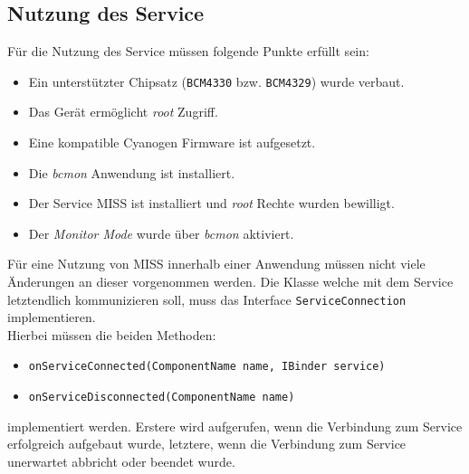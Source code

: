 \documentclass[]{report}
\begin{document}
\subsection{Nutzung des Service}\label{lab:usage}
Für die Nutzung des Service müssen folgende Punkte erfüllt sein:
\begin{itemize}
\item Ein unterstützter Chipsatz (\texttt{BCM4330} bzw. \texttt{BCM4329}) wurde verbaut.
\item Das Gerät ermöglicht \textit{root} Zugriff.
\item Eine kompatible Cyanogen Firmware ist aufgesetzt.
\item Die \textit{bcmon} Anwendung ist installiert.
\item Der Service MISS ist installiert und \textit{root} Rechte wurden bewilligt.
\item Der \textit{Monitor Mode} wurde über \textit{bcmon} aktiviert.
\end{itemize}
Für eine Nutzung von MISS innerhalb einer Anwendung müssen nicht viele Änderungen an dieser vorgenommen werden. Die Klasse welche mit dem Service letztendlich kommunizieren soll, muss das Interface \texttt{ServiceConnection} implementieren.\\
Hierbei müssen die beiden Methoden:
\begin{itemize}
\item \texttt{onServiceConnected(ComponentName name, IBinder service)}
\item \texttt{onServiceDisconnected(ComponentName name)}
\end{itemize}
implementiert werden. Erstere wird aufgerufen, wenn die Verbindung zum Service erfolgreich aufgebaut wurde, letztere, wenn die Verbindung zum Service unerwartet abbricht oder beendet wurde. \\
\end{document}
